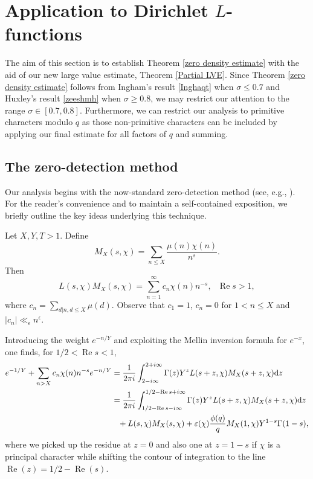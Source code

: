 \documentclass[12pt]{amsart}
\theoremstyle{definition}
\theoremstyle{plain}
\theoremstyle{remark}
\numberwithin{equation}{section}
\numberwithin{theorem}{section}
\renewcommand{\Re}{\operatorname{Re}}
\numberwithin{equation}{section}
\begin{document}
	\section{\texorpdfstring{Application to Dirichlet $L$-functions}
		{Application to Dirichlet L-functions}}\label{AppDL}
	The aim of this section is to establish Theorem \ref{zero density estimate} with the aid of our new large value estimate, Theorem \ref{Partial LVE}. Since Theorem \ref{zero density estimate} follows from Ingham's result \eqref{Inghaqt} when $\sigma \leq 0.7$ and Huxley's result \eqref{zeeshmh} when $\sigma \geq 0.8$, we may restrict our attention to the range $\sigma \in [0.7,0.8]$. Furthermore, we can restrict our analysis to primitive characters modulo $q$ as those non-primitive characters can be included by applying our final estimate for all factors of $q$ and summing.
	\subsection{The zero-detection method}\label{zedete}
	
	Our analysis begins with the now-standard zero-detection method (see, e.g., \cite[Chapter 12]{MontgomeryBook}). For the reader’s convenience and to maintain a self-contained exposition, we briefly outline the key ideas underlying this technique.
	
	Let $X,Y, T > 1$. Define
	\[
	M_{X}(s,\chi)= \sum_{n \leq X} \frac{\mu(n) \chi(n)}{n^{s}}.
	\]
	Then
	\[ L(s,\chi) M_X(s,\chi) = \sum_{n=1}^{\infty} c_n\chi(n) n^{-s}, \ \ \ \Re s > 1,
	\]
	where $c_n = \sum_{d | n , d \leq X} \mu(d)$. Observe that $c_1 = 1$, $c_n = 0$ for $1 < n \leq X$ and $|c_n| \ll_{\epsilon} n^{\epsilon}$.
	
	Introducing the weight $e^{-n/Y}$ and exploiting the Mellin inversion formula for $e^{-x}$, one finds, for $1/2 <\Re s < 1$,
	\begin{align}\label{zerodMI}
		e^{-1/Y} + \sum_{n > X} c_n \chi(n)n^{-s} e^{-n/Y} 
		& = \frac{1}{2\pi i} \int^{2 + i \infty}_{2 - i \infty} \Gamma(z) Y^{z} L(s + z,\chi) M_X(s+z,\chi) \mathrm{d}z 
		\notag
		\\
		& = \frac{1}{2\pi i} \int^{1/2 - \Re s + i \infty}_{1/2 - \Re s - i \infty} \Gamma(z) Y^{z} L(s + z,\chi) M_X(s+z,\chi) \mathrm{d}z 
		\notag
		\\
		& \phantom{=} {}+ L(s,\chi)M_X(s,\chi)+\varepsilon(\chi)\frac{\phi(q)}{q}M_{X}(1, \chi)Y^{1-s}\Gamma(1-s), 
	\end{align}
	where we picked up the residue at $z = 0$ and also one at $z=1-s$ if $\chi$ is a principal character while shifting the contour of integration to the line $\Re(z) = 1/2 - \Re(s)$.
	
\end{document}
